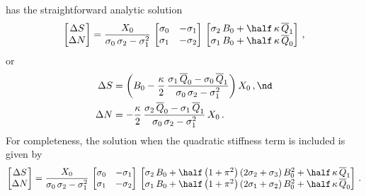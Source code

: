   has the straightforward analytic solution
\begin{equation}
  \begin{bmatrix}
    \Delta S \\
    \Delta N
  \end{bmatrix} = \frac{X_0}{\sigma_0\, \sigma_2 - \sigma_1^2}\,
  \begin{bmatrix}
    \sigma_0 & -\sigma_1 \\
    \sigma_1 & -\sigma_2
  \end{bmatrix}\,
  \begin{bmatrix}
    \sigma_2\, B_0 + \half\, \kappa\, \overline{Q}_1 \\
    \sigma_1\, B_0 + \half\, \kappa\, \overline{Q}_0
  \end{bmatrix}\, ,
\end{equation}
or
\begin{subequations} \label{eqn:rms_sol}
  \begin{align}
    \label{eqn:rms_sol_ds} \Delta S &= \left(B_0 - \frac{\kappa}{2}\, \frac{\sigma_1\, \overline{Q}_0 - \sigma_0\, \overline{Q}_1}{\sigma_0\, \sigma_2 - \sigma_1^2} \right) X_0\, , \nd \\
    \label{eqn:rms_sol_dn} \Delta N &= -\frac{\kappa}{2}\, \frac{\sigma_2\, \overline{Q}_0 - \sigma_1\, \overline{Q}_1}{\sigma_0\, \sigma_2 - \sigma_1^2}\, X_0\, .
  \end{align}
\end{subequations}
For completeness, the solution when the quadratic stiffness term is included is given by
 \begin{equation}\label{eqn:rms_sol_quad}
\begin{bmatrix}
  \Delta S \\
  \Delta N
\end{bmatrix} = \frac{X_0}{\sigma_0\, \sigma_2 - \sigma_1^2}\,
\begin{bmatrix}
  \sigma_0 & -\sigma_1 \\
  \sigma_1 & -\sigma_2
\end{bmatrix}\,
\begin{bmatrix}
  \sigma_2\, B_0 + \half \left(1 + \pi^2\right) \left(2 \sigma_2 + \sigma_3\right) B_0^2 + \half\, \kappa\, \overline{Q}_1 \\
  \sigma_1\, B_0 + \half \left(1 + \pi^2\right) \left(2 \sigma_1 + \sigma_2\right) B_0^2 + \half\, \kappa\, \overline{Q}_0
\end{bmatrix}\, .
 \end{equation}

